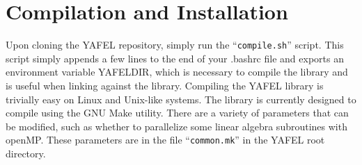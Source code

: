 \section{Compilation and Installation}
Upon cloning the YAFEL repository, simply run the ``\texttt{compile.sh}'' script.
This script simply appends a few lines to the end of your .bashrc file
and exports an environment variable YAFELDIR, which is necessary to
compile the library and is useful when linking against the library.
Compiling the YAFEL library is trivially easy on Linux and Unix-like systems.
The library is currently designed to compile using the GNU Make utility.
There are a variety of parameters that can be modified, such as whether 
to parallelize some linear algebra subroutines with openMP.
These parameters are in the file ``\texttt{common.mk}'' in the YAFEL root directory.
